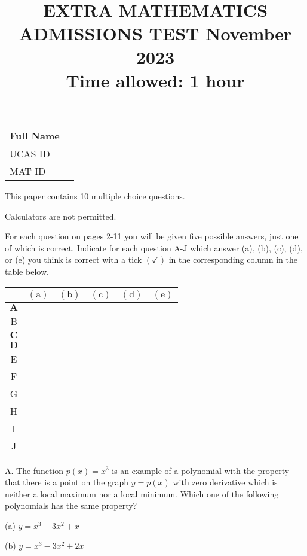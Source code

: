 \documentclass[10pt]{article}
\title{EXTRA MATHEMATICS ADMISSIONS TEST November 2023 \\
 Time allowed: 1 hour }
\author{}
\date{}
\begin{document}
\maketitle
\begin{center}
\begin{tabular}{|l|l|}
\hline
Full Name &  \\
\hline
UCAS ID &  \\
\hline
MAT ID &  \\
\hline
\end{tabular}
\end{center}

This paper contains 10 multiple choice questions.

Calculators are not permitted.

For each question on pages 2-11 you will be given five possible answers, just one of which is correct. Indicate for each question A-J which answer (a), (b), (c), (d), or (e) you think is correct with a tick $(\checkmark)$ in the corresponding column in the table below.

\begin{center}
\begin{tabular}{|c|c|c|c|c|c|}
\hline
 & $(\mathrm{a})$ & $(\mathrm{b})$ & $(\mathrm{c})$ & $(\mathrm{d})$ & $(\mathrm{e})$ \\
\hline
$\mathbf{A}$ &  &  &  &  &  \\
\hline
B &  &  &  &  &  \\
\hline
$\mathbf{C}$ &  &  &  &  &  \\
\hline
$\mathbf{D}$ &  &  &  &  &  \\
\hline
E &  &  &  &  &  \\
\hline
F &  &  &  &  &  \\
\hline
G &  &  &  &  &  \\
\hline
H &  &  &  &  &  \\
\hline
I &  &  &  &  &  \\
\hline
J &  &  &  &  &  \\
\hline
\end{tabular}
\end{center}

A. The function $p(x)=x^{3}$ is an example of a polynomial with the property that there is a point on the graph $y=p(x)$ with zero derivative which is neither a local maximum nor a local minimum. Which one of the following polynomials has the same property?

(a) $y=x^{3}-3 x^{2}+x$

(b) $y=x^{3}-3 x^{2}+2 x$
\end{document}
